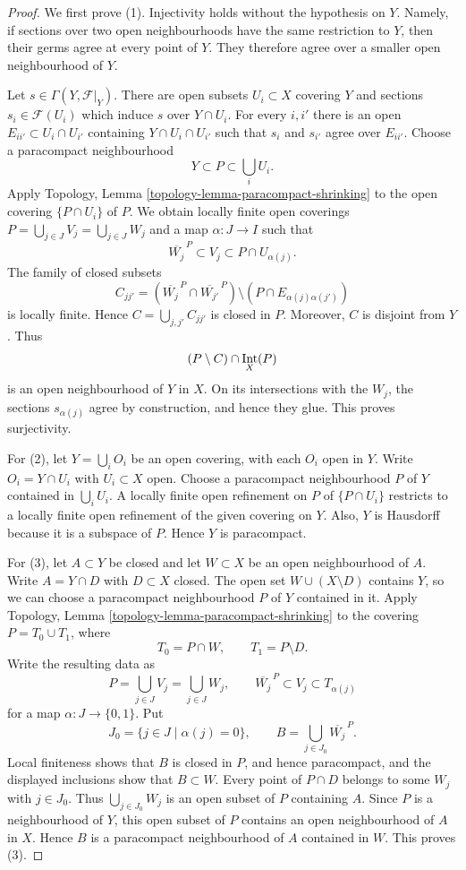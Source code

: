 \begin{proof}
We first prove (1). Injectivity holds without the hypothesis on $Y$. Namely,
if sections over two open neighbourhoods have the same restriction to $Y$,
then their germs agree at every point of $Y$. They therefore agree over a
smaller open neighbourhood of $Y$.

Let $s \in \Gamma(Y, \mathcal{F}|_Y)$. There are open subsets $U_i \subset X$
covering $Y$ and sections $s_i \in \mathcal{F}(U_i)$ which induce $s$ over
$Y \cap U_i$. For every $i,i'$ there is an open
$E_{ii'} \subset U_i \cap U_{i'}$ containing
$Y \cap U_i \cap U_{i'}$ such that $s_i$ and $s_{i'}$ agree over
$E_{ii'}$. Choose a paracompact neighbourhood
$$
Y \subset P \subset \bigcup_i U_i.
$$
Apply Topology, Lemma \ref{topology-lemma-paracompact-shrinking} to the open
covering $\{P \cap U_i\}$ of $P$. We obtain locally finite open coverings
$P=\bigcup_{j\in J}V_j=\bigcup_{j\in J}W_j$ and a map $\alpha:J\to I$ such
that
$$
\overline{W_j}^{\,P}\subset V_j\subset P\cap U_{\alpha(j)}.
$$
The family of closed subsets
$$
C_{jj'}=
\left(\overline{W_j}^{\,P}\cap\overline{W_{j'}}^{\,P}\right)
\setminus\left(P\cap E_{\alpha(j)\alpha(j')}\right)
$$
is locally finite. Hence $C=\bigcup_{j,j'}C_{jj'}$ is closed in $P$.
Moreover, $C$ is disjoint from $Y$. Thus
$$
(P\setminus C)\cap\mathop{\rm Int}_X(P)
$$
is an open neighbourhood of $Y$ in $X$. On its intersections with the
$W_j$, the sections $s_{\alpha(j)}$ agree by construction, and hence they
glue. This proves surjectivity.

For (2), let $Y=\bigcup_i O_i$ be an open covering, with each $O_i$ open in
$Y$. Write $O_i=Y\cap U_i$ with $U_i\subset X$ open. Choose a paracompact
neighbourhood $P$ of $Y$ contained in $\bigcup_iU_i$. A locally finite open
refinement on $P$ of $\{P\cap U_i\}$ restricts to a locally finite open
refinement of the given covering on $Y$. Also, $Y$ is Hausdorff because it
is a subspace of $P$. Hence $Y$ is paracompact.

For (3), let $A\subset Y$ be closed and let $W\subset X$ be an open
neighbourhood of $A$. Write $A=Y\cap D$ with $D\subset X$ closed. The open
set $W\cup(X\setminus D)$ contains $Y$, so we can choose a paracompact
neighbourhood $P$ of $Y$ contained in it. Apply
Topology, Lemma \ref{topology-lemma-paracompact-shrinking} to the covering
$P=T_0\cup T_1$, where
$$
T_0=P\cap W,\qquad T_1=P\setminus D.
$$
Write the resulting data as
$$
P=\bigcup_{j\in J}V_j=\bigcup_{j\in J}W_j,\qquad
\overline{W_j}^{\,P}\subset V_j\subset T_{\alpha(j)}
$$
for a map $\alpha:J\to\{0,1\}$. Put
$$
J_0=\{j\in J\mid\alpha(j)=0\},\qquad
B=\bigcup_{j\in J_0}\overline{W_j}^{\,P}.
$$
Local finiteness shows that $B$ is closed in $P$, and hence paracompact,
and the displayed inclusions show that $B\subset W$. Every point of
$P\cap D$ belongs to some $W_j$ with $j\in J_0$. Thus
$\bigcup_{j\in J_0}W_j$ is an open subset of $P$ containing $A$.
Since $P$ is a neighbourhood of $Y$, this open subset of $P$ contains an
open neighbourhood of $A$ in $X$. Hence $B$ is a paracompact neighbourhood
of $A$ contained in $W$. This proves (3).
\end{proof}

